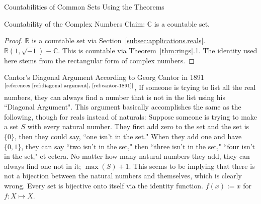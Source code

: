 \documentclass[12pt]{article}
\begin{document}
\begin{section}{Countabilities of Common Sets Using the Theorems}
	\begin{subsection}{Countability of the Complex Numbers}\label{subsec:applications.complex}
		Claim: $\mathbb C$ is a countable set.
		\begin{proof}
			$\mathbb R$ is a countable set via Section~\ref{subsec:applications.reals}.
			$\mathbb R(1, \sqrt{-1})\equiv\mathbb C$. This is countable via Theorem~\ref{thm:rings}.1.
			The identity used here stems from the rectangular form of complex numbers.
		\end{proof}
	\end{subsection}
\end{section}

\begin{section}{Cantor's Diagonal Argument}\label{sec:diagonal argument}
	According to Georg Cantor in 1891$^\text{[references \ref{ref:diagonal argument},
	\ref{ref:cantor-1891}]}$, If someone is trying to list all the real numbers, they can
	always find a number that is not in the list using his ``Diagonal Argument". This
	argument basically accomplishes the same as the following, though for reals instead of
	naturals: Suppose someone is trying to make a set $S$ with every natural number. They
	first add zero to the set and the set is $\{0\}$, then they could say, ``one isn't in
	the set." When they add one and have $\{0,1\}$, they can say ``two isn't in the set,"
	then ``three isn't in the set," ``four isn't in the set," et cetera. No matter how many
	natural numbers they add, they can always find one not in it; $\max(S)+1$. This seems
	to be implying that there is not a bijection between the natural numbers and themselves,
	which is clearly wrong. Every set is bijective onto itself via the identity function.
	$f(x) := x$ for  $f:X\mapsto X$.
\end{section}
\end{document}
